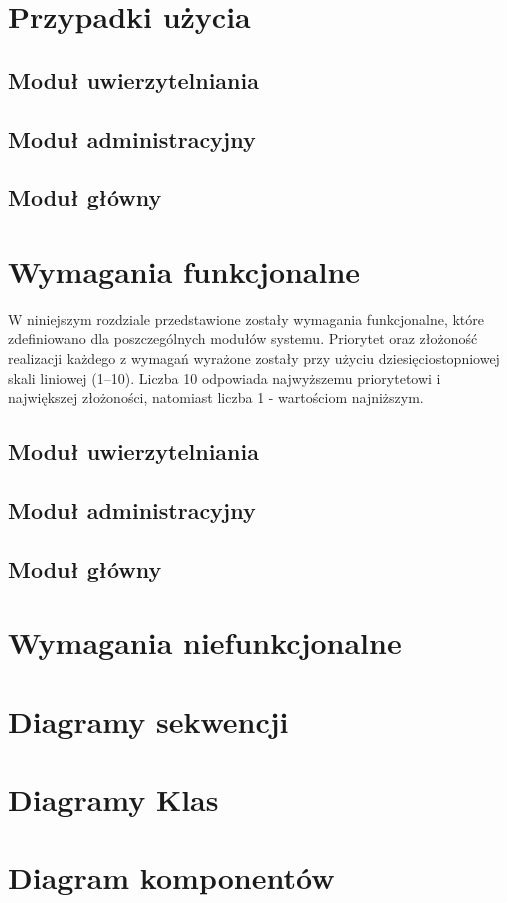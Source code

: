 \documentclass[12pt, oneside, final]{report}
\begin{document}
\chapter{Przypadki użycia}
\section{Moduł uwierzytelniania}

\section{Moduł administracyjny}

\section{Moduł główny}


\chapter{Wymagania funkcjonalne}
W niniejszym rozdziale przedstawione zostały wymagania funkcjonalne, które zdefiniowano dla poszczególnych modułów systemu. Priorytet oraz złożoność realizacji każdego z wymagań wyrażone zostały przy użyciu dziesięciostopniowej skali liniowej (1--10). Liczba 10 odpowiada najwyższemu priorytetowi i największej złożoności, natomiast liczba 1 - wartościom najniższym.
\section{Moduł uwierzytelniania}

\section{Moduł administracyjny}

\section{Moduł główny}


\chapter{Wymagania niefunkcjonalne}


\chapter{Diagramy sekwencji}


\chapter{Diagramy Klas}


\chapter{Diagram komponentów}

\end{document}

